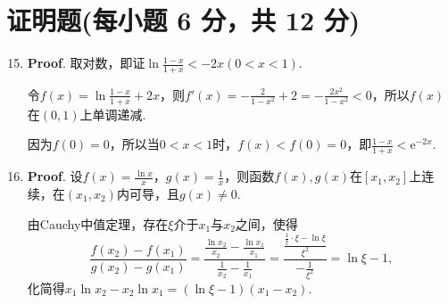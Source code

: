 \documentclass[../main.tex]{subfiles}
\begin{document}
\section{证明题(每小题 6 分，共 12 分)}
\begin{enumerate}
    \setcounter{enumi}{14}
    \item \textbf{Proof}. 取对数，即证$\ln\frac{1-x}{1+x}<-2x(0<x<1)$.

          令$f(x)=\ln\frac{1-x}{1+x}+2x$，则$f'(x)=-\frac{2}{1-x^{2}}+2=-\frac{2x^{2}}{1-x^{2}}
              <0$，所以$f(x)$在$(0,1)$上单调递减.

          因为$f(0)=0$，所以当$0<x<1$时，$f(x)<f(0)=0$，即$\frac{1-x}{1+x}<\mathrm{e}
              ^{-2x}$.

    \item \textbf{Proof}. 设$f(x)=\frac{\ln x}{x}$，$g(x)=\frac{1}{x}$，则函数$f
              (x),g(x)$在$[x_{1},x_{2}]$上连续，在$(x_{1},x_{2})$内可导，且$g(x)\neq0$.

          由Cauchy中值定理，存在$\xi$介于$x_{1}$与$x_{2}$之间，使得
          \[
              \frac{f(x_{2})-f(x_{1})}{g(x_{2})-g(x_{1})}=\frac{\frac{\ln x_{2}}{x_{2}}-\frac{\ln
                      x_{1}}{x_{1}}}{\frac{1}{x_{2}}-\frac{1}{x_{1}}}=\frac{\frac{\frac{1}{\xi}\cdot
                      \xi-\ln\xi}{\xi^{2}}}{-\frac{1}{\xi^{2}}}=\ln\xi-1,
          \]
          化简得$x_{1}\ln x_{2}-x_{2}\ln x_{1}=(\ln\xi-1)(x_{1}-x_{2})$.
\end{enumerate}
\end{document}
